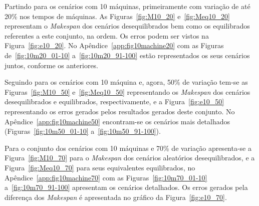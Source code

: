     
    
    
    
    
    
    Partindo para os cenários com 10 máquinas, primeiramente com variação de até 20\% nos tempos de máquinas. As Figuras~\ref{fig:M10_20} e~\ref{fig:Meq10_20} representam o \textit{Makespan} dos cenários desequilibrados bem como os equilibrados referentes a este conjunto, na ordem. Os erros podem ser vistos na Figura~\ref{fig:e10_20}. No Apêndice~\ref{app:fig10machine20} com as Figuras de~\ref{fig:10m20_01-10} a~\ref{fig:10m20_91-100} estão representados os seus cenários juntos, conforme os anteriores.
    
    
    
    
    
    
    
    Seguindo para os cenários com 10 máquina e, agora, 50\% de variação tem-se as Figuras~\ref{fig:M10_50} e~\ref{fig:Meq10_50} representando os \textit{Makespan} dos cenários desequilibrados e equilibrados, respectivamente, e a Figura~\ref{fig:e10_50} representando os erros gerados pelos resultados gerados deste conjunto. No Apêndice~\ref{app:fig10machine50} encontram-se os cenários mais detalhados (Figuras~\ref{fig:10m50_01-10} a~\ref{fig:10m50_91-100}).
    
    
    
    
    
    
    
    Para o conjunto dos cenários com 10 máquinas e 70\% de variação apresenta-se a Figura~\ref{fig:M10_70} para o \textit{Makespan} dos cenários aleatórios desequilibrados, e a Figura~\ref{fig:Meq10_70} para seus equivalentes equilibrados, no Apêndice~\ref{app:fig10machine70} com as Figuras~\ref{fig:10m70_01-10} a~\ref{fig:10m70_91-100} apresentam os cenários detalhados. Os erros gerados pela diferença dos \textit{Makespan} é apresentada no gráfico da Figura~\ref{fig:e10_70}.
    
    
    
    
    
